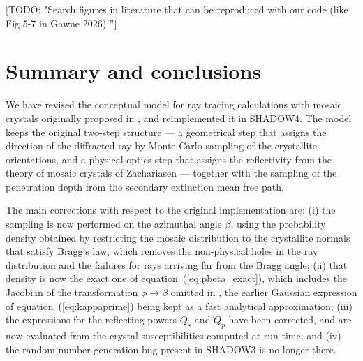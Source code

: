 \documentclass{iucr}
\newcommand{\todo}[1]{{\color{red}[TODO: "#1'']}}
\begin{document}
\todo{Search figures in literature that can be reproduced with our code (like Fig 5-7 in Gawne 2026) }




\section{Summary and conclusions}
\label{sec:summary}

We have revised the conceptual model for ray tracing calculations with mosaic
crystals originally proposed in \cite{mosaicsSanchezDelRio1992}, and reimplemented
it in SHADOW4. The model keeps the original two-step structure --- a geometrical
step that assigns the direction of the diffracted ray by Monte Carlo sampling of
the crystallite orientations, and a physical-optics step that assigns the
reflectivity from the theory of mosaic crystals of Zachariasen --- together with
the sampling of the penetration depth from the secondary extinction mean free path.

The main corrections with respect to the original implementation are: (i) the
sampling is now performed on the azimuthal angle $\beta$, using the probability
density obtained by restricting the mosaic distribution to the crystallite normals
that satisfy Bragg's law, which removes the non-physical holes in the ray
distribution and the failures for rays arriving far from the Bragg angle; (ii) that
density is now the exact one of equation~(\ref{eq:pbeta_exact}), which includes the
Jacobian of the transformation $\phi \rightarrow \beta$ omitted in
\cite{mosaicsSanchezDelRio2013}, the earlier Gaussian expression of
equation~(\ref{eq:kappaprime}) being kept as a fast analytical approximation;
(iii) the expressions for the reflecting powers $Q_s$ and $Q_p$ have been
corrected, and are now evaluated from the crystal susceptibilities computed at run
time; and (iv) the random number generation bug present in SHADOW3 is no longer
there.
\end{document}
